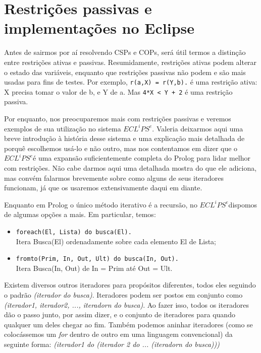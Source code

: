 \documentclass{article}
\newcommand{\eclipse}{$ECL^iPS^e$}
\begin{document}
\section{Restrições passivas e implementações no Eclipse}

Antes de sairmos por aí resolvendo CSPs e COPs, será útil termos a distinção entre restrições ativas e passivas. Resumidamente, restrições ativas podem alterar o estado das variáveis, enquanto que restrições passivas não podem e são mais usadas para fins de testes. Por exemplo, {\tt r(a,X) = r(Y,b).} é uma restrição ativa: X precisa tomar o valor de b, e Y de a. Mas {\tt 4*X < Y + 2} é uma restrição passiva.

Por enquanto, nos preocuparemos mais com restrições passivas e veremos exemplos de sua utilização no sistema \eclipse. Valeria deixarmos aqui uma breve introdução à história desse sistema e uma explicação mais detalhada de porquê escolhemos usá-lo e não outro, mas nos contentamos em dizer que o \eclipse é uma expansão suficientemente completa do Prolog para lidar melhor com restrições. Não cabe darmos aqui uma detalhada mostra do que ele adiciona, mas convém falarmos brevemente
sobre como alguns de seus iteradores funcionam, já que os usaremos extensivamente daqui em diante.

Enquanto em Prolog o único método iterativo é a recursão, no \eclipse dispomos de algumas opções a mais. Em particular, temos:

\begin{itemize}
  \item {\tt foreach(El, Lista) do busca(El).}
    \\ Itera Busca(El) ordenadamente sobre cada elemento El de Lista;
  \item {\tt fromto(Prim, In, Out, Ult) do busca(In, Out).}
    \\ Itera Busca(In, Out) de In = Prim até Out = Ult.
\end{itemize}

Existem diversos outros iteradores para propósitos diferentes, todos eles seguindo o padrão  \textit{(iterador do busca)}. Iteradores podem ser postos em conjunto como \textit{(iterador1, iterador2, ..., iteradorn do busca)}. Ao fazer isso, todos os iteradores dão o passo junto, por assim dizer, e o conjunto de iteradores para quando qualquer um deles chegar ao fim. Também podemos aninhar iteradores (como se colocássemos um \textit{for} dentro de outro em uma linguagem
convencional) da seguinte forma: \textit{(iterador1 do (iterador 2 do ... (iteradorn do busca)))}
\end{document}
